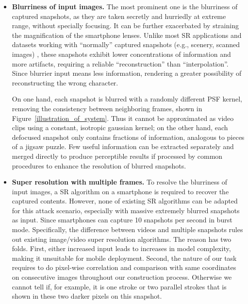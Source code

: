 \begin{itemize}[leftmargin=*]
  \item \textbf{Blurriness of input images.} The most prominent one is the blurriness of captured snapshots, as they are taken secretly and hurriedly at extreme range, without specially focusing. It can be further exacerbated by straining the magnification of the smartphone lenses. Unlike most SR applications and datasets working with ``normally'' captured snapshots (e.g., scenery, scanned images) \cite{nasrollahi2020deep,lyn2020image}, these snapshots exhibit lower concentrations of information and more artifacts, requiring a reliable ``reconstruction'' than ``interpolation''. Since blurrier input means less information, rendering a greater possibility of reconstructing the wrong character. 

  On one hand, each snapshot is blurred with a randomly different PSF kernel, removing the consistency between neighboring frames, shown in Figure~\ref{illustration_of_system}. Thus it cannot be approximated as video clips using a constant, isotropic gaussian kernel; on the other hand, each defocused snapshot only contains fractions of information, analogous to pieces of a jigsaw puzzle.
  Few useful information can be extracted separately and merged directly to produce perceptible results if processed by common procedures to enhance the resolution of blurred snapshots. 
  \item \textbf{Super resolution with multiple frames.} To resolve the blurriness of input images, a SR algorithm on a smartphone is required to recover the captured contents. However, none of existing SR algorithms can be adapted for this attack scenario, especially with massive extremely blurred snapshots as input. Since smartphones can capture 10 snapshots per second in burst mode. Specifically, the difference between videos and multiple snapshots rules out existing image/video super resolution algorithms. The reason has two folds. First, either increased input leads to increases in model complexity, making it unsuitable for mobile deployment. Second, the nature of our task requires to do pixel-wise correlation and comparison with same coordinates on consecutive images throughout our construction process. Otherwise we cannot tell if, for example, it is one stroke or two parallel strokes that is shown in these two darker pixels on this snapshot.

\end{itemize}
